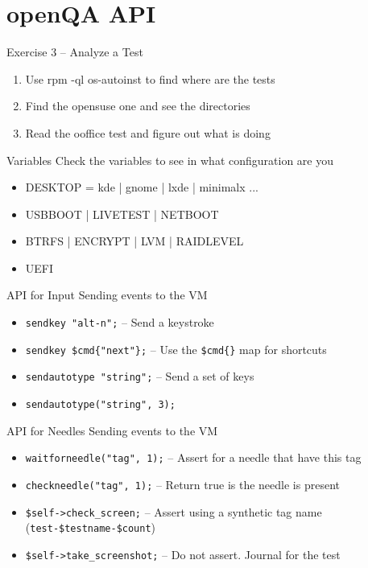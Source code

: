 \documentclass{beamer}
\begin{document}
\section{openQA API}
%
%
\begin{frame}{Exercise 3 -- Analyze a Test}
  \begin{enumerate}
  \item Use rpm -ql os-autoinst to find where are the tests
  \item Find the opensuse one and see the directories
  \item Read the ooffice test and figure out what is doing
  \end{enumerate}
\end{frame}

%
%
\begin{frame}{Variables}
  Check the variables to see in what configuration are you
  \begin{itemize}
  \item DESKTOP = kde | gnome | lxde | minimalx ...
  \item USBBOOT | LIVETEST | NETBOOT
  \item BTRFS | ENCRYPT | LVM | RAIDLEVEL
  \item UEFI
  \end{itemize}
\end{frame}

\begin{frame}{API for Input}
  Sending events to the VM
  \begin{itemize}
  \item \texttt{sendkey "alt-n";} -- Send a keystroke
  \item \texttt{sendkey \$cmd\{"next"\};} -- Use the \texttt{\$cmd\{\}} map for shortcuts
  \item \texttt{sendautotype "string";} -- Send a set of keys
  \item \texttt{sendautotype("string", 3);}
  \end{itemize}
\end{frame}

\begin{frame}{API for Needles}
  Sending events to the VM
  \begin{itemize}
  \item \texttt{waitforneedle("tag", 1);} -- Assert for a needle that have this tag
  \item \texttt{checkneedle("tag", 1);} -- Return true is the needle is present
  \item \texttt{\$self->check\_screen;} -- Assert using a synthetic tag name (\texttt{test-\$testname-\$count})
  \item \texttt{\$self->take\_screenshot;} -- Do not assert. Journal for the test
  \end{itemize}
\end{frame}
\end{document}
